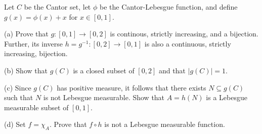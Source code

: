 \documentclass[10pt]{article}
\newenvironment{problem}[2][Problem]{\begin{trivlist}
\item[\hskip \labelsep {\bfseries #1}\hskip \labelsep {\bfseries #2.}]}{\end{trivlist}}
\begin{document}
\begin{problem}{5.1.7}

Let $C$ be the Cantor set, let $\phi$ be the Cantor-Lebesgue function, and define $g(x) = \phi(x) + x$ for $x \in [0,1]$.

(a) Prove that $g: [0,1] \to [0,2]$ is continous, strictly increasing, and a bijection. Further, its inverse $h = g^{-1}: [0,2] \to [0,1]$ is also a continuous, strictly increasing, bijection.

(b) Show that $g(C)$ is a closed subset of $[0,2]$ and that $|g(C)| = 1$.

(c) Since $g(C)$ has positive measure, it follows that there exists $N \subseteq g(C)$ such that $N$ is not Lebesgue measurable. Show that $A = h(N)$ is a Lebesgue measurable subset of $[0,1]$.

(d) Set $f = \chi_A$. Prove that $f \circ h$ is not a Lebesgue measurable function.

\end{problem}
\end{document}
